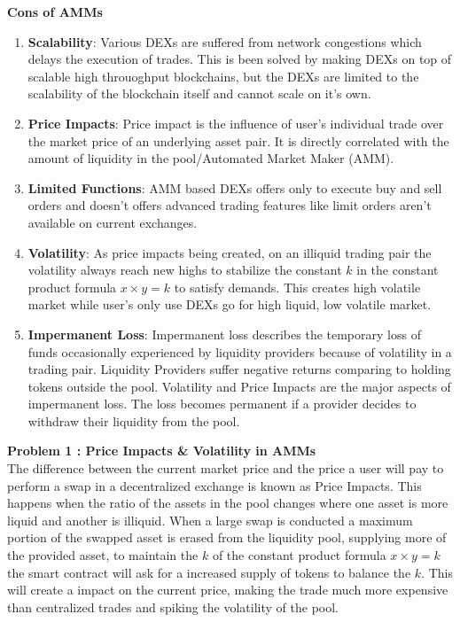 \documentclass[letterpaper,11pt]{article}
\begin{document}
\textbf{Cons of AMMs}
\begin{enumerate}[wide, labelwidth=!, labelindent=0pt]
\item \textbf{Scalability}: Various DEXs are suffered from network congestions which delays the execution of trades. This is been solved by making DEXs on top of scalable high throuoghput blockchains, but the DEXs are limited to the scalability of the blockchain itself and cannot scale on it's own.
\item \textbf{Price Impacts}: Price impact is the influence of user's individual trade over the market price of an underlying asset pair. It is directly correlated with the amount of liquidity in the pool/Automated Market Maker (AMM).
\item \textbf{Limited Functions}: AMM based DEXs offers only to execute buy and sell orders and doesn't offers advanced trading features like limit orders aren't available on current exchanges.
\item \textbf{Volatility}: As price impacts being created, on an illiquid trading pair the volatility always reach new highs to stabilize the constant $k$ in the constant product formula $x \times  y=k$ to satisfy demands. This creates high volatile market while user's only use DEXs go for high liquid, low volatile market.
\item \textbf{Impermanent Loss}: Impermanent loss describes the temporary loss of funds occasionally experienced by liquidity providers because of volatility in a trading pair. Liquidity Providers suffer negative returns comparing to holding tokens outside the pool. Volatility and Price Impacts are the major aspects of impermanent loss. The loss becomes permanent if a provider decides to withdraw their liquidity from the pool.
\end{enumerate}

\textbf{Problem 1 : Price Impacts \& Volatility in AMMs}\\

The difference between the current market price and the price a user will pay to perform a swap in a decentralized exchange is known as Price Impacts. This happens when the ratio of the assets in the pool changes where one asset is more liquid and another is illiquid. When a large swap is conducted a maximum portion of the swapped asset is erased from the liquidity pool, supplying more of the provided asset, to maintain the $k$ of the constant product formula $x \times y=k$ the smart contract will ask for a increased supply of tokens to balance the $k$. This will create a impact on the current price, making the trade much more expensive than centralized trades and spiking the volatility of the pool.\\
\end{document}

